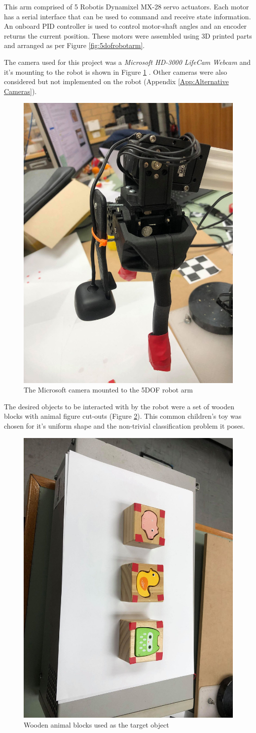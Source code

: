 \documentclass{UoNMCHA}
\numberwithin{equation}{section}
\begin{document}
This arm comprised of 5 Robotis Dynamixel MX-28 servo actuators. Each motor has a serial interface that can be used to command and receive state information. An onboard PID controller is used to control motor-shaft angles and an encoder returns the current position. These motors were assembled using 3D printed parts and arranged as per Figure \ref{fig:5dofrobotarm}. 
	
The camera used for this project was a \textit{Microsoft HD-3000 LifeCam Webcam} and it's mounting to the robot is shown in Figure \ref{fig:Cameramounting}  . Other cameras were also considered but not implemented on the robot (Appendix \ref{App:Alternative Cameras}).\\

\begin{figure}[H]
	\begin{center}
		\includegraphics[width=.4\linewidth]{Figures/mountedCamera}
		\caption{The Microsoft camera mounted to the 5DOF robot arm}
		\label{fig:Cameramounting}
	\end{center}
\end{figure}	

The desired objects to be interacted with by the robot were a set of wooden blocks with animal figure cut-outs (Figure \ref{fig:PIGGYpic}). This common children's toy was chosen for it's uniform shape and the non-trivial classification problem it poses.

\begin{figure}[H]
	\begin{center}
		\includegraphics[width=.4\linewidth , angle = 90]{Figures/PIGGYpic}
		\caption{Wooden animal blocks used as the target object}
		\label{fig:PIGGYpic}
	\end{center}
\end{figure}
\end{document}
